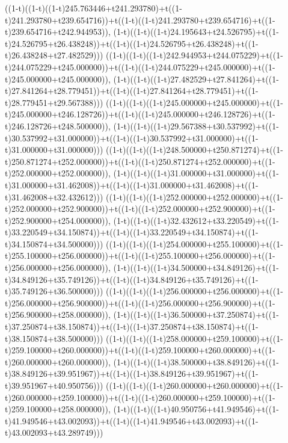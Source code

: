 ((1-t)((1-t)((1-t)245.763446+t241.293780)+t((1-t)241.293780+t239.654716))+t((1-t)((1-t)241.293780+t239.654716)+t((1-t)239.654716+t242.944953)),                                     (1-t)((1-t)((1-t)24.195643+t24.526795)+t((1-t)24.526795+t26.438248))+t((1-t)((1-t)24.526795+t26.438248)+t((1-t)26.438248+t27.482529)))
((1-t)((1-t)((1-t)242.944953+t244.075229)+t((1-t)244.075229+t245.000000))+t((1-t)((1-t)244.075229+t245.000000)+t((1-t)245.000000+t245.000000)),                                     (1-t)((1-t)((1-t)27.482529+t27.841264)+t((1-t)27.841264+t28.779451))+t((1-t)((1-t)27.841264+t28.779451)+t((1-t)28.779451+t29.567388)))
((1-t)((1-t)((1-t)245.000000+t245.000000)+t((1-t)245.000000+t246.128726))+t((1-t)((1-t)245.000000+t246.128726)+t((1-t)246.128726+t248.500000)),                                     (1-t)((1-t)((1-t)29.567388+t30.537992)+t((1-t)30.537992+t31.000000))+t((1-t)((1-t)30.537992+t31.000000)+t((1-t)31.000000+t31.000000)))
((1-t)((1-t)((1-t)248.500000+t250.871274)+t((1-t)250.871274+t252.000000))+t((1-t)((1-t)250.871274+t252.000000)+t((1-t)252.000000+t252.000000)),                                     (1-t)((1-t)((1-t)31.000000+t31.000000)+t((1-t)31.000000+t31.462008))+t((1-t)((1-t)31.000000+t31.462008)+t((1-t)31.462008+t32.432612)))
((1-t)((1-t)((1-t)252.000000+t252.000000)+t((1-t)252.000000+t252.900000))+t((1-t)((1-t)252.000000+t252.900000)+t((1-t)252.900000+t254.000000)),                                     (1-t)((1-t)((1-t)32.432612+t33.220549)+t((1-t)33.220549+t34.150874))+t((1-t)((1-t)33.220549+t34.150874)+t((1-t)34.150874+t34.500000)))
((1-t)((1-t)((1-t)254.000000+t255.100000)+t((1-t)255.100000+t256.000000))+t((1-t)((1-t)255.100000+t256.000000)+t((1-t)256.000000+t256.000000)),                                     (1-t)((1-t)((1-t)34.500000+t34.849126)+t((1-t)34.849126+t35.749126))+t((1-t)((1-t)34.849126+t35.749126)+t((1-t)35.749126+t36.500000)))
((1-t)((1-t)((1-t)256.000000+t256.000000)+t((1-t)256.000000+t256.900000))+t((1-t)((1-t)256.000000+t256.900000)+t((1-t)256.900000+t258.000000)),                                     (1-t)((1-t)((1-t)36.500000+t37.250874)+t((1-t)37.250874+t38.150874))+t((1-t)((1-t)37.250874+t38.150874)+t((1-t)38.150874+t38.500000)))
((1-t)((1-t)((1-t)258.000000+t259.100000)+t((1-t)259.100000+t260.000000))+t((1-t)((1-t)259.100000+t260.000000)+t((1-t)260.000000+t260.000000)),                                     (1-t)((1-t)((1-t)38.500000+t38.849126)+t((1-t)38.849126+t39.951967))+t((1-t)((1-t)38.849126+t39.951967)+t((1-t)39.951967+t40.950756)))
((1-t)((1-t)((1-t)260.000000+t260.000000)+t((1-t)260.000000+t259.100000))+t((1-t)((1-t)260.000000+t259.100000)+t((1-t)259.100000+t258.000000)),                                     (1-t)((1-t)((1-t)40.950756+t41.949546)+t((1-t)41.949546+t43.002093))+t((1-t)((1-t)41.949546+t43.002093)+t((1-t)43.002093+t43.289749)))
